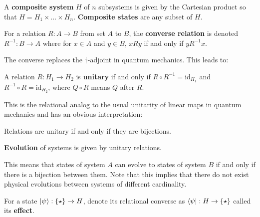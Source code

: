 \begin{axiom}
A \textbf{composite system} $H$ of $n$ subsystems is given by the Cartesian product so that $H = H_1\times...\times H_n$. \textbf{Composite states} are any subset of $H$.
\end{axiom}

\begin{defn}
For a relation $R:A\to B$ from set $A$ to $B$, the \textbf{converse relation} is denoted $R^{-1}:B\to A$ where for $x\in A$ and $y\in B$, $xRy$ if and only if $yR^{-1}x$.
\end{defn}

\noindent The converse replaces the $\dagger$-adjoint in quantum mechanics. This leads to:

\begin{defn}
A relation $R:H_1\to H_2$ is \textbf{unitary} if and only if $R\circ R^{-1} = \mbox{id}_{H_1}$ and $R^{-1}\circ R = \mbox{id}_{H_2}$, where $Q\circ R$ means $Q$ after $R$.
\end{defn}

\noindent This is the relational analog to the usual unitarity of linear maps in quantum mechanics and has an obvious interpretation:

\begin{corollary}
\label{cor:bijections}
Relations are unitary if and only if they are bijections.
\end{corollary}

\begin{axiom}
\textbf{Evolution} of systems is given by unitary relations.
\end{axiom}

\noindent This means that states of system $A$ can evolve to states of system $B$ if and only if there is a bijection between them. Note that this implies that there do not exist physical evolutions between systems of different cardinality. %

\begin{defn}
For a state $| \psi \rangle:\{\star\}\to H$, denote its relational converse as $\langle \psi |:H\to\{\star\}$ called its \textbf{effect}.
\end{defn}

